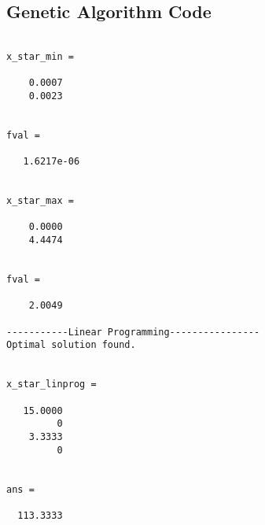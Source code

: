 \documentclass[11pt]{article}
\begin{document}
\subsection*{Genetic Algorithm Code}









\begin{lstlisting}[caption={Output},label={lst:op}]

x_star_min =

    0.0007
    0.0023


fval =

   1.6217e-06


x_star_max =

    0.0000
    4.4474


fval =

    2.0049

-----------Linear Programming----------------
Optimal solution found.


x_star_linprog =

   15.0000
         0
    3.3333
         0


ans =

  113.3333
\end{lstlisting}
\end{document}
